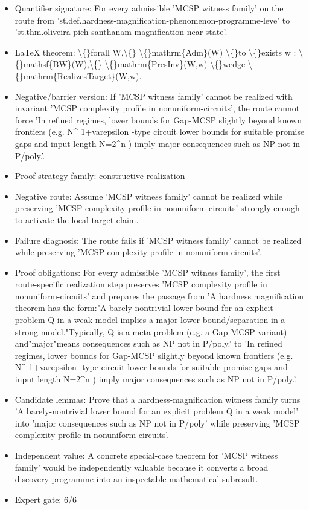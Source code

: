 \documentclass[11pt]{article}
\begin{document}
\begin{itemize}
\item Quantifier signature: For every admissible 'MCSP witness family' on the route from 'st.def.hardness-magnification-phenomenon-programme-leve' to 'st.thm.oliveira-pich-santhanam-magnification-near-state'.
\item LaTeX theorem: \textbackslash\{\}forall W,\textbackslash\{\} \textbackslash\{\}mathrm\{Adm\}(W) \textbackslash\{\}to \textbackslash\{\}exists w : \textbackslash\{\}mathsf\{BW\}(W),\textbackslash\{\} \textbackslash\{\}mathrm\{PresInv\}(W,w) \textbackslash\{\}wedge \textbackslash\{\}mathrm\{RealizesTarget\}(W,w).
\item Negative/barrier version: If 'MCSP witness family' cannot be realized with invariant 'MCSP complexity profile in nonuniform-circuits', the route cannot force 'In refined regimes, lower bounds for Gap-MCSP slightly beyond known frontiers (e.g. N\textasciicircum{} 1+varepsilon -type circuit lower bounds for suitable promise gaps and input length N=2\textasciicircum{}n ) imply major consequences such as NP not in P/poly.'.
\item Proof strategy family: constructive-realization
\item Negative route: Assume 'MCSP witness family' cannot be realized while preserving 'MCSP complexity profile in nonuniform-circuits' strongly enough to activate the local target claim.
\item Failure diagnosis: The route fails if 'MCSP witness family' cannot be realized while preserving 'MCSP complexity profile in nonuniform-circuits'.
\item Proof obligations: For every admissible 'MCSP witness family', the first route-specific realization step preserves 'MCSP complexity profile in nonuniform-circuits' and prepares the passage from 'A hardness magnification theorem has the form:"A barely-nontrivial lower bound for an explicit problem Q in a weak model implies a major lower bound/separation in a strong model."Typically, Q is a meta-problem (e.g. a Gap-MCSP variant) and"major"means consequences such as NP not in P/poly.' to 'In refined regimes, lower bounds for Gap-MCSP slightly beyond known frontiers (e.g. N\textasciicircum{} 1+varepsilon -type circuit lower bounds for suitable promise gaps and input length N=2\textasciicircum{}n ) imply major consequences such as NP not in P/poly.'.
\item Candidate lemmas: Prove that a hardness-magnification witness family turns 'A barely-nontrivial lower bound for an explicit problem Q in a weak model' into 'major consequences such as NP not in P/poly' while preserving 'MCSP complexity profile in nonuniform-circuits'.
\item Independent value: A concrete special-case theorem for 'MCSP witness family' would be independently valuable because it converts a broad discovery programme into an inspectable mathematical subresult.
\item Expert gate: 6/6
\end{itemize}
\end{document}
